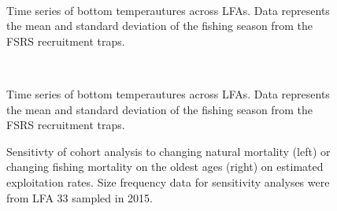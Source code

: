 \documentclass[11pt]{article}
\newcommand{\e}{/backup/bio_data/bio.lobster/figures/} %
\begin{document}
\begin{landscape}
\begin{figure}
        \centering
         \\
                    
                    \caption{Time series of bottom temperautures across LFAs. Data represents the mean and standard deviation of the fishing season from the FSRS recruitment traps.}
        \end{figure}

\begin{figure}
        \centering
         \\
                    
                    \caption{Time series of bottom temperautures across LFAs. Data represents the mean and standard deviation of the fishing season from the FSRS recruitment traps.}
        \end{figure}

\end{landscape}





\begin{figure}
\centering
              \caption{Sensitivty of cohort analysis to changing natural mortality (left) or changing fishing mortality on the oldest ages (right) on estimated exploitation rates. Size frequency data for sensitivity analyses were from LFA 33 sampled in 2015.}
\end{figure}
\end{document}
